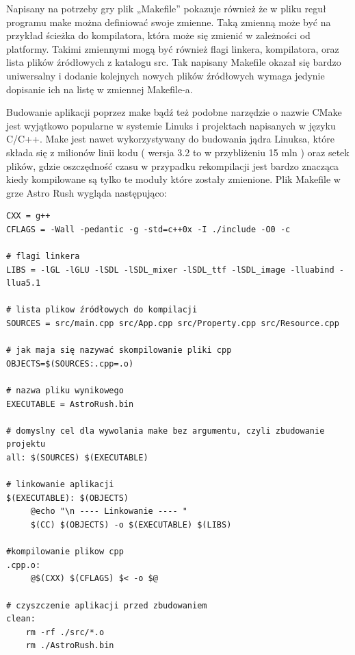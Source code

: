 Napisany na potrzeby gry plik „Makefile” pokazuje również że w pliku reguł programu make można definiować swoje zmienne. Taką zmienną może być na przykład ścieżka do kompilatora, która może się zmienić w zależności od platformy. Takimi zmiennymi mogą być również flagi linkera, kompilatora, oraz lista plików źródłowych z katalogu src. Tak napisany Makefile okazał się bardzo uniwersalny i dodanie kolejnych nowych plików źródłowych wymaga jedynie dopisanie ich na listę w zmiennej Makefile-a. 

Budowanie aplikacji poprzez make bądź też podobne narzędzie o nazwie CMake jest wyjątkowo popularne w systemie Linuks i projektach napisanych w języku C/C++. Make jest nawet wykorzystywany do budowania jądra Linuksa, które składa się z milionów linii kodu ( wersja 3.2 to w przybliżeniu 15 mln ) oraz setek plików, gdzie oszczędność czasu w przypadku rekompilacji jest bardzo znacząca kiedy kompilowane są tylko te moduły które zostały zmienione. Plik Makefile w grze Astro Rush wygląda następująco:
\begingroup
\fontsize{10pt}{12pt}\selectfont
\begin{verbatim}  
CXX = g++
CFLAGS = -Wall -pedantic -g -std=c++0x -I ./include -O0 -c

# flagi linkera
LIBS = -lGL -lGLU -lSDL -lSDL_mixer -lSDL_ttf -lSDL_image -lluabind -llua5.1

# lista plikow źródłowych do kompilacji
SOURCES = src/main.cpp src/App.cpp src/Property.cpp src/Resource.cpp 

# jak maja się nazywać skompilowanie pliki cpp
OBJECTS=$(SOURCES:.cpp=.o)

# nazwa pliku wynikowego
EXECUTABLE = AstroRush.bin

# domyslny cel dla wywolania make bez argumentu, czyli zbudowanie projektu
all: $(SOURCES) $(EXECUTABLE)

# linkowanie aplikacji
$(EXECUTABLE): $(OBJECTS)
	 @echo "\n ---- Linkowanie ---- "
	 $(CC) $(OBJECTS) -o $(EXECUTABLE) $(LIBS)

#kompilowanie plikow cpp
.cpp.o:
	 @$(CXX) $(CFLAGS) $< -o $@

# czyszczenie aplikacji przed zbudowaniem  
clean:
	rm -rf ./src/*.o
	rm ./AstroRush.bin 

\end{verbatim}  
\endgroup


